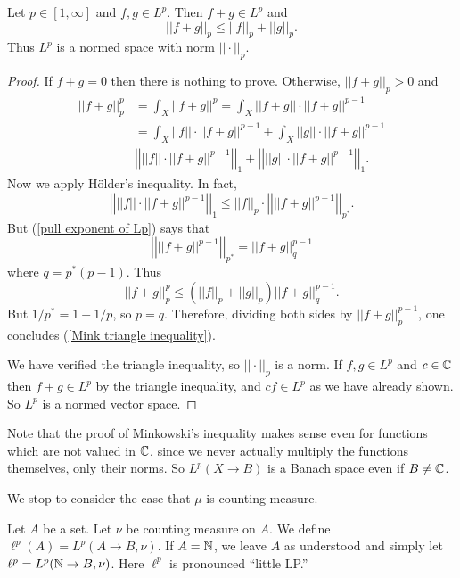 \begin{theorem}
Let $p \in [1, \infty]$ and $f, g \in L^{p}$. Then $f + g \in L^{p}$ and
\begin{equation}\label{Mink triangle inequality}
||f + g||_{p}  \leq ||f||_{p}  + ||g||_{p} .
\end{equation}
Thus $L^{p}$ is a normed space with norm $||\cdot||_{p} $.
\end{theorem}
\begin{proof}
If $f + g = 0$ then there is nothing to prove.
Otherwise, $||f + g||_{p}  > 0$ and
\begin{align*}
||f + g||_{p} ^{p} &= \int_{X} ||f + g||^{p} = \int_{X} ||f + g||\cdot ||f + g||^{p-1} \\
&= \int_{X} ||f||\cdot ||f + g||^{p-1} + \int_{X} ||g||\cdot ||f + g||^{p-1}\\
&\left|\left|||f||\cdot ||f + g||^{p-1}\right|\right|_{1} + \left|\left|||g||\cdot ||f + g||^{p-1}\right|\right|_{1}.
\end{align*}
Now we apply H\"older's inequality. In fact,
\[\left|\left|||f||\cdot ||f + g||^{p-1}\right|\right|_{1} \leq ||f||_{p}  \cdot \left|\left|||f + g||^{p-1}\right|\right|_{p^{*}}.\]
But (\ref{pull exponent of Lp}) says that
\[\left|\left|||f + g||^{p-1}\right|\right|_{p^{*}} = ||f + g||_{q}^{p - 1}\]
where $q = p^{*}(p-1)$. Thus
\[||f + g||_{p} ^{p} \leq (||f||_{p}  + ||g||_{p} ) ||f + g||_{q}^{p - 1}.\]
But $1/p^{*} = 1 - 1/p$, so $p = q$. Therefore, dividing both sides by $||f + g||_{p} ^{p - 1}$, one concludes (\ref{Mink triangle inequality}).

We have verified the triangle inequality, so $||\cdot||_{p} $ is a norm. If $f, g \in L^{p}$ and $c \in \mathbb{C}$ then $f + g \in L^{p}$ by the triangle inequality, and $cf \in L^{p}$ as we have already shown.
So $L^{p}$ is a normed vector space.
\end{proof}
Note that the proof of Minkowski's inequality makes sense even for functions which are not valued in $\mathbb{C}$, since we never actually multiply the functions themselves, only their norms. So $L^{p}(X \to B)$ is a Banach space even if $B \neq \mathbb{C}$.

We stop to consider the case that $\mu$ is counting measure.

\begin{definition}
Let $A$ be a set. Let $\nu$ be counting measure on $A$. We define $\ell^{p}(A) = L^{p}(A \to B, \nu)$.
If $A = \mathbb{N}$, we leave $A$ as understood and simply let $\ell^{p} = L^{p}(\mathbb{N} \to B, \nu)$.
Here $\ell^{p}$ is pronounced ``little LP.''
\end{definition}


